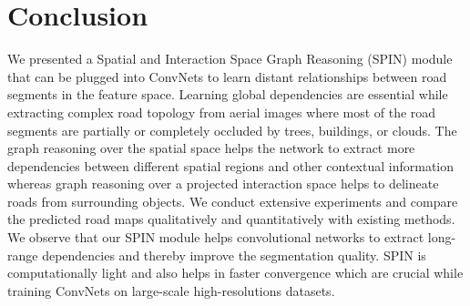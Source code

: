 \documentclass[letterpaper, 10 pt, conference]{ieeeconf}
\begin{document}
\section{Conclusion}
We presented a Spatial and Interaction Space Graph Reasoning (SPIN) module that can be plugged into ConvNets to learn distant relationships between road segments in the feature space. Learning global dependencies are essential while extracting complex road topology from  aerial images where most of the road segments are partially or completely occluded by trees, buildings, or clouds. The graph reasoning over the spatial space helps the network to extract more dependencies between different spatial regions and other contextual information whereas graph reasoning
over a projected interaction space helps to delineate roads from surrounding objects. We conduct extensive experiments and compare the predicted road maps qualitatively and quantitatively with existing methods. We observe that our SPIN module helps convolutional networks to extract long-range dependencies and thereby improve the segmentation quality. SPIN is computationally light and also helps in faster convergence which are crucial while training ConvNets on large-scale high-resolutions datasets.




\end{document}
